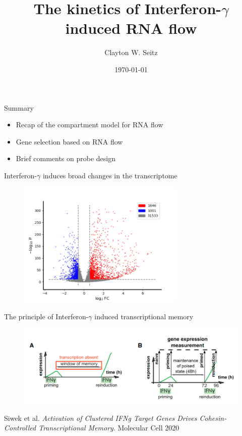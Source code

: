 \documentclass[aspectratio=1610]{beamer}					%
\title{The kinetics of Interferon-$\gamma$ induced RNA flow}	%
\author{Clayton W. Seitz}								%
\date{\today}									%
\begin{document}
\begin{frame}
  \titlepage
\end{frame}


%

\begin{frame}{Summary}
\begin{itemize}
\item Recap of the compartment model for RNA flow
\item Gene selection based on RNA flow
\item Brief comments on probe design
\end{itemize}
\end{frame}

\begin{frame}{Interferon-$\gamma$ induces broad changes in the transcriptome}
\begin{figure}
\includegraphics[width=8cm]{volcano.png}
\caption{}
\end{figure}

\end{frame}


\begin{frame}{The principle of Interferon-$\gamma$ induced transcriptional memory}
\begin{figure}
\includegraphics[width=14cm]{figure-1.png}
\caption{}
\end{figure}

Siwek et al. \textit{Activation of Clustered IFNg Target Genes Drives Cohesin-Controlled Transcriptional Memory}. Molecular Cell 2020

\end{frame}
\end{document}
